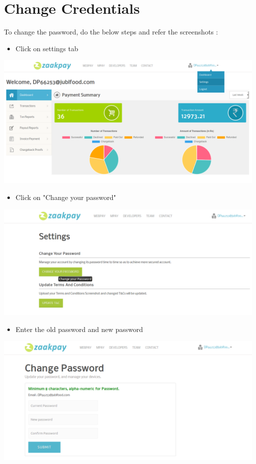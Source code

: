 \documentclass{article}
\begin{document}
\section{Change Credentials}
To change the password, do the below steps and refer the screenshots : 
\begin{itemize}
\item Click on settings tab
\end{itemize}
\includegraphics[width=6.5 in,height=3.4 in]{Settings.png}
\begin{itemize}
\item Click on "Change your password"
\end{itemize}
\includegraphics[width=6.5 in,height=2.4 in]{change_pass.png}
\newpage
\begin{itemize}
\item Enter the old password and new password
\end{itemize}
\includegraphics[width=6.5 in,height=3.4 in]{update_pass.png}
\newpage
\end{document}
